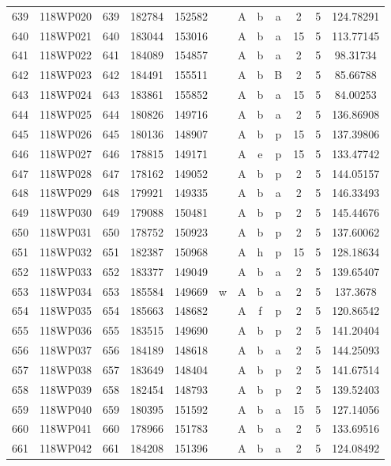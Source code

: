 \begin{tabular}{|*{12}{c|}}
639 & 118WP020 & 639 & 182784 & 152582 &  & A & b & a & 2 & 5 & 124.78291 \\ 
640 & 118WP021 & 640 & 183044 & 153016 &  & A & b & a & 15 & 5 & 113.77145 \\ 
641 & 118WP022 & 641 & 184089 & 154857 &  & A & b & a & 2 & 5 & 98.31734 \\ 
642 & 118WP023 & 642 & 184491 & 155511 &  & A & b & B & 2 & 5 & 85.66788 \\ 
643 & 118WP024 & 643 & 183861 & 155852 &  & A & b & a & 15 & 5 & 84.00253 \\ 
644 & 118WP025 & 644 & 180826 & 149716 &  & A & b & a & 2 & 5 & 136.86908 \\ 
645 & 118WP026 & 645 & 180136 & 148907 &  & A & b & p & 15 & 5 & 137.39806 \\ 
646 & 118WP027 & 646 & 178815 & 149171 &  & A & e & p & 15 & 5 & 133.47742 \\ 
647 & 118WP028 & 647 & 178162 & 149052 &  & A & b & p & 2 & 5 & 144.05157 \\ 
648 & 118WP029 & 648 & 179921 & 149335 &  & A & b & a & 2 & 5 & 146.33493 \\ 
649 & 118WP030 & 649 & 179088 & 150481 &  & A & b & p & 2 & 5 & 145.44676 \\ 
650 & 118WP031 & 650 & 178752 & 150923 &  & A & b & p & 2 & 5 & 137.60062 \\ 
651 & 118WP032 & 651 & 182387 & 150968 &  & A & h & p & 15 & 5 & 128.18634 \\ 
652 & 118WP033 & 652 & 183377 & 149049 &  & A & b & a & 2 & 5 & 139.65407 \\ 
653 & 118WP034 & 653 & 185584 & 149669 & w & A & b & a & 2 & 5 & 137.3678 \\ 
654 & 118WP035 & 654 & 185663 & 148682 &  & A & f & p & 2 & 5 & 120.86542 \\ 
655 & 118WP036 & 655 & 183515 & 149690 &  & A & b & p & 2 & 5 & 141.20404 \\ 
656 & 118WP037 & 656 & 184189 & 148618 &  & A & b & a & 2 & 5 & 144.25093 \\ 
657 & 118WP038 & 657 & 183649 & 148404 &  & A & b & p & 2 & 5 & 141.67514 \\ 
658 & 118WP039 & 658 & 182454 & 148793 &  & A & b & p & 2 & 5 & 139.52403 \\ 
659 & 118WP040 & 659 & 180395 & 151592 &  & A & b & a & 15 & 5 & 127.14056 \\ 
660 & 118WP041 & 660 & 178966 & 151783 &  & A & b & a & 2 & 5 & 133.69516 \\ 
661 & 118WP042 & 661 & 184208 & 151396 &  & A & b & a & 2 & 5 & 124.08492 \\ 

\end{tabular}
